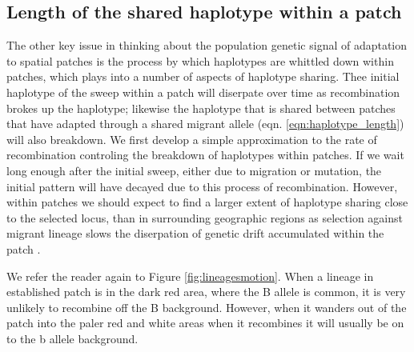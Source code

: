\documentclass{article}
\begin{document}
\subsection{Length of the shared haplotype within a patch}
\label{ss:patch_haplotype}

The other key issue in thinking about the population genetic signal of
adaptation to spatial patches is the process by which haplotypes are
whittled down within patches, which plays into a number of aspects of
haplotype sharing. Thee initial haplotype of the sweep within a patch will
diserpate over time as recombination brokes up the haplotype; likewise the haplotype that is shared 
between patches that have
adapted through a shared migrant allele
(eqn. \ref{eqn:haplotype_length}) will also breakdown. 
We first develop a simple approximation to the rate of
recombination controling the breakdown of haplotypes within patches. 
If we wait long enough after the initial sweep,
either due to migration or mutation, the initial pattern will have
decayed due to this process of recombination. However, within patches
we should expect to find a larger extent of haplotype sharing close to
the selected locus, than in surrounding geographic regions as
selection against migrant lineage slows the diserpation of
genetic drift accumulated within the patch \citep{bartonpaper,charlesworths}. 

We refer the reader again to Figure \ref{fig:lineagesmotion}. When a lineage in
established patch is in the dark red area, where the B allele is common, it is very unlikely to
recombine off the B background. However, when it wanders out of the
patch into the paler red and white areas when it recombines it will
usually be on to the b allele background.
\end{document}
